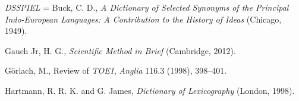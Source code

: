 \begin{list}{}

\item %
\textit{DSSPIEL} = Buck, C. D., \textit{A Dictionary of Selected Synonyms of the Principal Indo-European Languages: A Contribution to the History of Ideas} (Chicago, 1949). 



\item %
Gauch Jr, H. G., \textit{Scientific Method in Brief} (Cambridge, 2012).


\item %
Görlach, M., Review of \textit{TOE1}, \textit{Anglia} 116.3 (1998), 398–401.



\item %
Hartmann, R. R. K. and G. James, \textit{Dictionary of Lexicography} (London, 1998).




\end{list}
